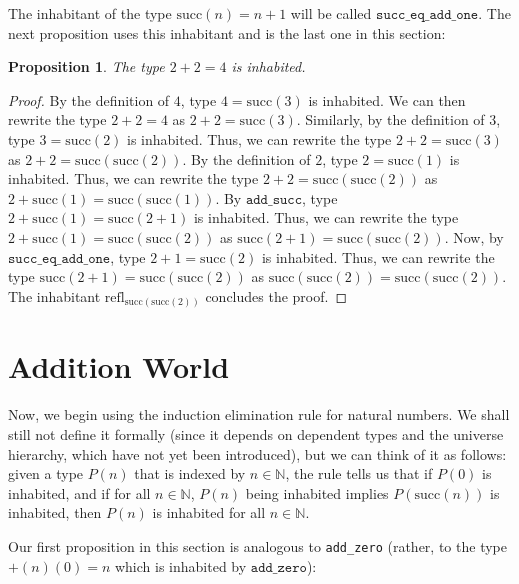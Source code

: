 \documentclass[12pt]{article}
\newtheorem{proposition}{Proposition}[section]
\theoremstyle{definition}
\theoremstyle{remark}
\begin{document}
The inhabitant of the type $\text{succ}(n) = n+1$ will be called $\texttt{succ\_eq\_add\_one}$. The next proposition uses this inhabitant and is the last one in this section:

\begin{proposition}
  The type $2+2=4$ is inhabited.
\end{proposition}
\begin{proof}
  By the definition of $4$, type $4 = \text{succ}(3)$ is inhabited. We can then rewrite the type $2+2=4$ as $2+2=\text{succ}(3)$. Similarly, by the definition of $3$, type $3 = \text{succ}(2)$ is inhabited. Thus, we can rewrite the type $2+2=\text{succ}(3)$ as $2+2=\text{succ}(\text{succ}(2))$. By the definition of $2$, type $2 = \text{succ}(1)$ is inhabited. Thus, we can rewrite the type $2+2=\text{succ}(\text{succ}(2))$ as $2+\text{succ}(1)=\text{succ}(\text{succ}(1))$. By $\texttt{add\_succ}$, type $2+\text{succ}(1)=\text{succ}(2+1)$ is inhabited. Thus, we can rewrite the type $2+\text{succ}(1)=\text{succ}(\text{succ}(2))$ as $\text{succ}(2+1)=\text{succ}(\text{succ}(2))$. Now, by $\texttt{succ\_eq\_add\_one}$, type $2+1=\text{succ}(2)$ is inhabited. Thus, we can rewrite the type $\text{succ}(2+1)=\text{succ}(\text{succ}(2))$ as $\text{succ}(\text{succ}(2))=\text{succ}(\text{succ}(2))$.
  The inhabitant $\text{refl}_{\text{succ}(\text{succ}(2))}$ concludes the proof.
\end{proof} 

\section{Addition World}

Now, we begin using the induction elimination rule for natural numbers. We shall still not define it formally (since it depends on dependent types and the universe hierarchy, which have not yet been introduced), but we can think of it as follows: given a type $P(n)$ that is indexed by $n \in \mathbb{N}$, the rule tells us that if $P(0)$ is inhabited, and if for all $n \in \mathbb{N}$, $P(n)$ being inhabited implies $P(\text{succ}(n))$ is inhabited, then $P(n)$ is inhabited for all $n \in \mathbb{N}$. 

Our first proposition in this section is analogous to \texttt{add\_zero} (rather, to the type $+(n)(0) = n$ which is inhabited by $\texttt{add\_zero}$):
\end{document}
